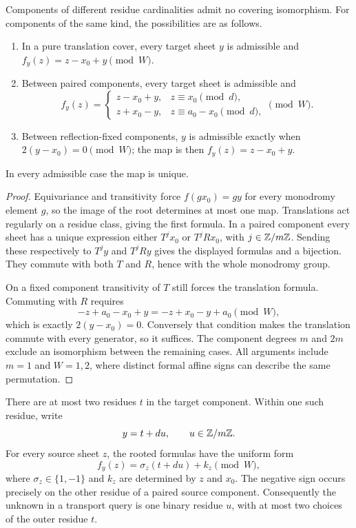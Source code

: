 \begin{lemma}\label{lem:bt-rooted}
Components of different residue cardinalities admit no covering
isomorphism.  For components of the same kind, the possibilities are as
follows.
\begin{enumerate}
\item In a pure translation cover, every target sheet $y$ is admissible and
$f_y(z)=z-x_0+y\pmod W$.
\item Between paired components, every target sheet is admissible and
\[
 f_y(z)=
 \begin{cases}
 z-x_0+y,&z\equiv x_0\pmod d,\\
 z+x_0-y,&z\equiv a_0-x_0\pmod d,
 \end{cases}\pmod W.
\]
\item Between reflection-fixed components, $y$ is admissible exactly when
$2(y-x_0)=0\pmod W$; the map is then $f_y(z)=z-x_0+y$.
\end{enumerate}
In every admissible case the map is unique.
\end{lemma}
\begin{proof}
Equivariance and transitivity force $f(gx_0)=gy$ for every monodromy
element $g$, so the image of the root determines at most one map.
Translations act regularly on a residue class, giving the first formula.
In a paired component every sheet has a unique expression either
$T^j x_0$ or $T^jRx_0$, with $j\in\mathbb Z/m\mathbb Z$.  Sending these respectively to
$T^jy$ and $T^jRy$ gives the displayed formulas and a bijection.  They
commute with both $T$ and $R$, hence with the whole monodromy group.

On a fixed component transitivity of $T$ still forces the translation
formula.  Commuting with $R$ requires
\[
 -z+a_0-x_0+y=-z+x_0-y+a_0\pmod W,
\]
which is exactly $2(y-x_0)=0$.  Conversely that condition makes the
translation commute with every generator, so it suffices.  The component
degrees $m$ and $2m$ exclude an isomorphism between the remaining cases.
All arguments include $m=1$ and $W=1,2$, where distinct formal affine
signs can describe the same permutation.
\end{proof}

There are at most two residues $t$ in the target component.  Within one
such residue, write
\begin{equation}\label{eq:bt-root-parameter}
 y=t+du,\qquad u\in\mathbb Z/m\mathbb Z.
\end{equation}
For every source sheet $z$, the rooted formulas have the uniform form
\begin{equation}\label{eq:bt-uniform-map}
 f_y(z)=\sigma_z(t+du)+k_z\pmod W,
\end{equation}
where $\sigma_z\in\{1,-1\}$ and $k_z$ are determined by $z$ and $x_0$.
The negative sign occurs precisely on the other residue of a paired
source component.  Consequently the unknown in a transport query is one
binary residue $u$, with at most two choices of the outer residue $t$.

